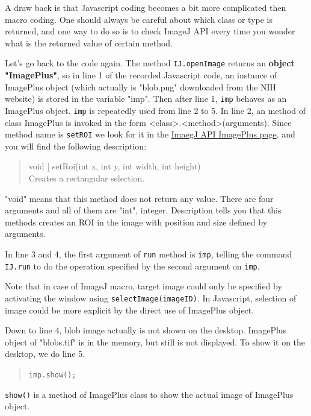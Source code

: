\documentclass[11pt,a4paper,oneside]{report}
\newcommand{\ilcom}[1]{\texttt{\small#1}}
\begin{document}
A draw back is that Javascript coding becomes a bit more complicated then macro
coding. One should always be careful about which class or type is returned, 
and one way to do so is to check ImageJ API every time you wonder what is the
returned value of certain method.

Let's go back to the code again. 
The method \ilcom{IJ.openImage} returns an \textbf{object "ImagePlus"}, 
so in line 1 of the recorded Javascript code, 
an instance of ImagePlus object (which actually is "blob.png" downloaded from the NIH website) 
is stored in the variable "imp". 
Then after line 1, \ilcom{imp} behaves as an ImagePlus object. 
\ilcom{imp} is repeatedly used from line 2 to 5. In line 2, an method of class ImagePlus is invoked 
in the form <class>.<method>(arguments). 
Since method name is \ilcom{setROI} we look for it in the 
\href{http://rsb.info.nih.gov/ij/developer/api/ij/ImagePlus.html}{ImaegJ API ImagePlus page}, 
and you will find the following description:

\begin{quote}
void | setRoi(int x, int y, int width, int height) \\
          Creates a rectangular selection.
\end{quote}

"void" means that this method does not return any value. 
There are four arguments and all of them are "int", integer. 
Description tells you that this methods creates an ROI in the image with position and size 
defined by arguments.  

In line 3 and 4, the first argument of \ilcom{run} method is \ilcom{imp}, 
telling the command \ilcom{IJ.run} to do the operation specified by the second argument on \ilcom{imp}. 

Note that in case of ImageJ macro, target image could only be specified by 
activating the window using \ilcom{selectImage(imageID)}. 
In Javascript, selection of image could be more explicit by the direct use of ImagePlus object.  

Down to line 4, blob image actually is not shown on the desktop. 
ImagePlus object of "blobs.tif" is in the memory, but still is not displayed. To
show it on the desktop, we do line 5.

\begin{quote}
\ilcom{imp.show();}
\end{quote}

\ilcom{show()} is a method of ImagePlus class to show the actual image of ImagePlus object. 
\end{document}
